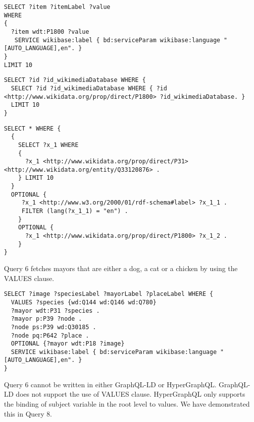 \begin{minipage}{\linewidth}
\begin{lstlisting}[label=listing:listing43, caption={Query 5}]
SELECT ?item ?itemLabel ?value
WHERE
{
  ?item wdt:P1800 ?value
   SERVICE wikibase:label { bd:serviceParam wikibase:language "[AUTO_LANGUAGE],en". }
}
LIMIT 10
\end{lstlisting}
\end{minipage}

\begin{minipage}{\linewidth}
\begin{lstlisting}[label=listing:listing44, caption={Query 5 - GraphQL-LD}]
SELECT ?id ?id_wikimediaDatabase WHERE {
  SELECT ?id ?id_wikimediaDatabase WHERE { ?id <http://www.wikidata.org/prop/direct/P1800> ?id_wikimediaDatabase. }
  LIMIT 10
}
\end{lstlisting}
\end{minipage}

\begin{minipage}{\linewidth}
\begin{lstlisting}[label=listing:listing45, caption={Query 5 - HypergraphQL}]
SELECT * WHERE {
  {
    SELECT ?x_1 WHERE
    {
      ?x_1 <http://www.wikidata.org/prop/direct/P31> <http://www.wikidata.org/entity/Q33120876> .
    } LIMIT 10
  }
  OPTIONAL {
     ?x_1 <http://www.w3.org/2000/01/rdf-schema#label> ?x_1_1 .
     FILTER (lang(?x_1_1) = "en") .
    }
    OPTIONAL {
      ?x_1 <http://www.wikidata.org/prop/direct/P1800> ?x_1_2 .
    }
}
\end{lstlisting}
\end{minipage}

Query 6 fetches mayors that are either a dog, a cat or a chicken by using the VALUES clause.

\begin{minipage}{\linewidth}
\begin{lstlisting}[label=listing:listing46, caption={Query 6}]
SELECT ?image ?speciesLabel ?mayorLabel ?placeLabel WHERE {
  VALUES ?species {wd:Q144 wd:Q146 wd:Q780}
  ?mayor wdt:P31 ?species .
  ?mayor p:P39 ?node .
  ?node ps:P39 wd:Q30185 .
  ?node pq:P642 ?place .
  OPTIONAL {?mayor wdt:P18 ?image}
  SERVICE wikibase:label { bd:serviceParam wikibase:language "[AUTO_LANGUAGE],en". }
}
\end{lstlisting}
\end{minipage}

Query 6 cannot be written in either GraphQL-LD or HyperGraphQL. GraphQL-LD does not support the use of VALUES clause. HyperGraphQL only supports the binding of subject variable in the root level to values. We have demonstrated this in Query 8.

